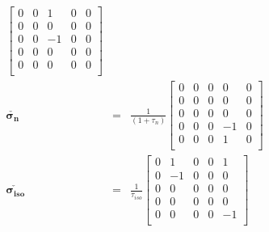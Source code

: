\documentclass[notitlepage, superscriptaddress]{revtex4-2}
\begin{document}
\begin{eqnarray}
\begin{bmatrix}
    0 & 0 & 1 & 0 & 0  \\ 
    0 & 0 & 0 & 0 & 0  \\
    0 & 0 & -1 & 0 & 0  \\
    0 & 0 & 0 & 0 & 0  \\
    0 & 0 & 0 & 0 & 0  \\
    \end{bmatrix}   \\ 
%
\boldsymbol{\check{\sigma_{n}}} &=& \frac{1}{(1 + \tau_{n})}
    \begin{bmatrix}
    0 & 0 & 0 & 0 & 0  \\ 
    0 & 0 & 0 & 0 & 0  \\
    0 & 0 & 0 & 0 & 0  \\
    0 & 0 & 0 & -1 & 0  \\
    0 & 0 & 0 & 1 & 0  \\
    \end{bmatrix}   \\ 
%
\boldsymbol{\check{\sigma_{iso}}} &=& \frac{1}{\tau_{iso}}
    \begin{bmatrix}
    0 & 1 & 0 & 0 & 1  \\ 
    0 & -1 & 0 & 0 & 0  \\
    0 & 0 & 0 & 0 & 0  \\
    0 & 0 & 0 & 0 & 0  \\
    0 & 0 & 0 & 0 & -1  \\
    \end{bmatrix}
\end{eqnarray}
\end{document}
